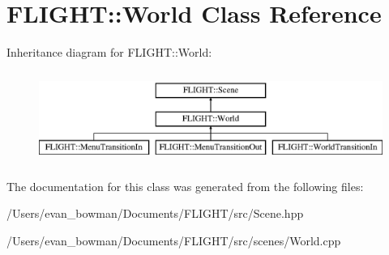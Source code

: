 \hypertarget{class_f_l_i_g_h_t_1_1_world}{}\section{F\+L\+I\+G\+HT\+:\+:World Class Reference}
\label{class_f_l_i_g_h_t_1_1_world}
Inheritance diagram for F\+L\+I\+G\+HT\+:\+:World\+:\begin{figure}[H]
\begin{center}
\leavevmode
\includegraphics[height=3.000000cm]{class_f_l_i_g_h_t_1_1_world}
\end{center}
\end{figure}


The documentation for this class was generated from the following files\+:\begin{DoxyCompactItemize}
\item 
/\+Users/evan\+\_\+bowman/\+Documents/\+F\+L\+I\+G\+H\+T/src/Scene.\+hpp\item 
/\+Users/evan\+\_\+bowman/\+Documents/\+F\+L\+I\+G\+H\+T/src/scenes/World.\+cpp\end{DoxyCompactItemize}
